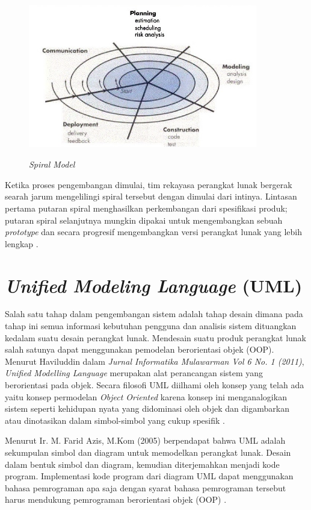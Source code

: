 \begin{figure}[H]
	\centering
	\includegraphics[width=10cm,height=7cm]{gambar/spiral}
	\caption{\textit{Spiral Model}}
	\label{spiral_model}
\end{figure}

Ketika proses pengembangan dimulai, tim rekayasa perangkat lunak bergerak searah jarum mengelilingi spiral tersebut dengan dimulai dari intinya. Lintasan pertama putaran spiral menghasilkan perkembangan dari spesifikasi produk; putaran spiral selanjutnya mungkin dipakai untuk mengembangkan sebuah \textit{prototype} dan secara progresif mengembangkan versi perangkat lunak yang lebih lengkap \cite{Pressman}.

\section{\textit{Unified Modeling Language} (UML)} 

Salah satu tahap dalam pengembangan sistem adalah tahap desain dimana pada tahap ini semua informasi kebutuhan pengguna dan analisis sistem dituangkan kedalam suatu desain perangkat lunak. Mendesain suatu produk perangkat lunak salah satunya dapat menggunakan pemodelan berorientasi objek (OOP). Menurut Haviluddin dalam \textit{Jurnal Informatika Mulawarman Vol 6 No. 1 (2011)}, \textit{Unified Modelling Language} merupakan alat perancangan sistem yang berorientasi pada objek. Secara filosofi UML diilhami oleh konsep yang telah ada yaitu konsep permodelan \textit{Object Oriented} karena konsep ini menganalogikan sistem seperti kehidupan nyata yang didominasi oleh objek dan digambarkan atau dinotasikan dalam simbol-simbol yang cukup spesifik \cite{Haviluddin}.
 
Menurut Ir. M. Farid Azis, M.Kom (2005) berpendapat bahwa UML adalah sekumpulan simbol dan diagram untuk memodelkan perangkat lunak. Desain dalam bentuk simbol dan diagram, kemudian diterjemahkan menjadi kode program. Implementasi kode program dari diagram UML dapat menggunakan bahasa pemrograman apa saja dengan syarat bahasa pemrograman tersebut harus mendukung pemrograman berorientasi objek (OOP) \cite{Azis}. 

